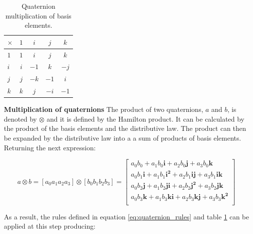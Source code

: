 \begin{table}[H]
    \begin{center}
        \begin{tabular}[t]{l|cccc}
            \hline
            $\times$ & $1$ & $i$  & $j$  & $k$  \\
            \hline
            $1$      & $1$ & $i$  & $j$  & $k$  \\
            $i$      & $i$ & $-1$ & $k$  & $-j$ \\
            $j$      & $j$ & $-k$ & $-1$ & $i$  \\
            $k$      & $k$ & $j$  & $-i$ & $-1$ \\
            \hline
        \end{tabular}
        \caption{Quaternion multiplication of basis elements. }
        \label{tab:quaternion_multiplication}
    \end{center}
\end{table}

\item \textbf{Multiplication of quaternions} The product of two quaternions, $a$ and $b$, is denoted by $\otimes$ and it is defined by the Hamilton product. It can be calculated by the product of the basis elements and the distributive law. The product can then be expanded by the distributive law into a a sum of products of basis elements. Returning the next expression:

\begin{equation}
    a \otimes b = \left[a_0 a_1 a_2 a_3\right] \otimes \left[b_0 b_1 b_2 b_3\right]     =
    \begin{bmatrix}
        a_0 b_0 + a_1 b_0\boldsymbol{i} + a_2 b_0\boldsymbol{j} + a_3 b_0\boldsymbol{k}                   \\
        a_0 b_1\boldsymbol{i} + a_1 b_1\boldsymbol{i^2} + a_2 b_1\boldsymbol{ij} + a_3 b_1\boldsymbol{ik} \\
        a_0 b_2\boldsymbol{j}+ a_1 b_2\boldsymbol{ji} + a_2 b_2\boldsymbol{j^2} + a_3 b_2\boldsymbol{jk}  \\
        a_0 b_3\boldsymbol{k} + a_1 b_3\boldsymbol{ki} + a_2 b_3\boldsymbol{kj} + a_3 b_3\boldsymbol{k^2} \\
    \end{bmatrix}
\end{equation}

As a result, the rules defined in equation \ref{eq:quaternion_rules} and table \ref{tab:quaternion_multiplication} can be applied at this step producing:

